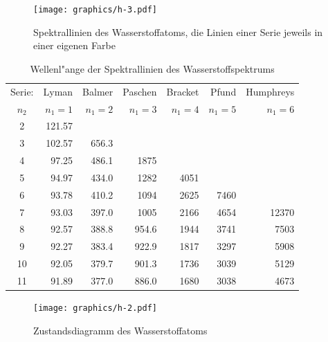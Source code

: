 \begin{figure}
\centering
\texttt{[image: graphics/h-3.pdf]}
\caption{Spektrallinien des Wasserstoffatoms, die Linien einer Serie jeweils
in einer eigenen Farbe
\label{skript:hspektrallinien}}
\end{figure}


\begin{table}
\begin{center}
\begin{tabular}{crrrrrr}
\hline
Serie:&  Lyman  &  Balmer & Paschen          & Bracket &  Pfund  & Humphreys \\
$n_2$ & $n_1=1$ & $n_1=2$ & $n_1=3$          & $n_1=4$ & $n_1=5$ & $n_1=6$   \\
\hline
    2 &  121.57 &         &                  &         &         &           \\
    3 &  102.57 &   656.3 &                  &         &         &           \\
    4 &   97.25 &   486.1 &  1875\phantom{.0}&         &         &           \\
    5 &   94.97 &   434.0 &  1282\phantom{.0}&  4051   &         &           \\
    6 &   93.78 &   410.2 &  1094\phantom{.0}&  2625   &   7460  &           \\
    7 &   93.03 &   397.0 &  1005\phantom{.0}&  2166   &   4654  & 12370     \\
    8 &   92.57 &   388.8 &   954.6          &  1944   &   3741  &  7503     \\
    9 &   92.27 &   383.4 &   922.9          &  1817   &   3297  &  5908     \\
   10 &   92.05 &   379.7 &   901.3          &  1736   &   3039  &  5129     \\
   11 &   91.89 &   377.0 &   886.0          &  1680   &   3038  &  4673     \\
\hline
\end{tabular}
\end{center}
\caption{Wellenl"ange der Spektrallinien des Wasserstoffspektrums
\label{skript:h2wellenlaengen}}
\end{table}

\begin{figure}
\centering
\texttt{[image: graphics/h-2.pdf]}
\caption{Zustandsdiagramm des Wasserstoffatoms
\label{skript:zustandsdiagramm}}
\end{figure}

